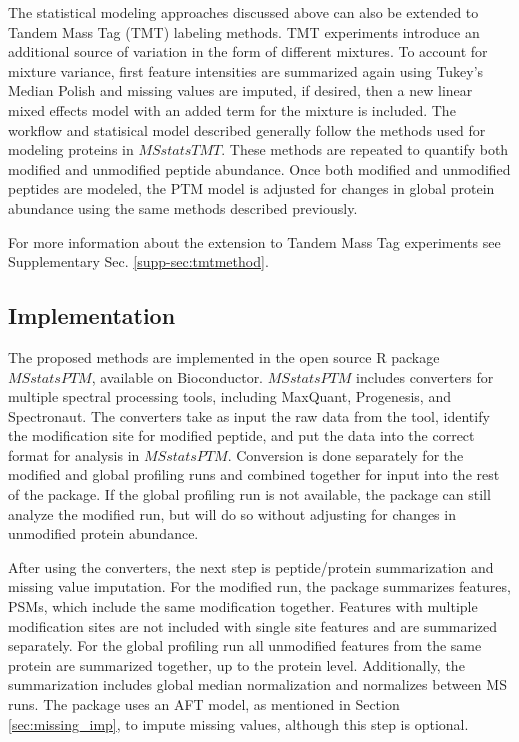 \documentclass[mcp]{article}
\numberwithin{figure}{section} %
\numberwithin{table}{section}
\begin{document}
The statistical modeling approaches discussed above can also be extended to Tandem Mass Tag (TMT) labeling methods. TMT experiments introduce an additional source of variation in the form of different mixtures. To account for mixture variance, first feature intensities are summarized again using Tukey's Median Polish and missing values are imputed, if desired, then a new linear mixed effects model with an added term for the mixture is included. The workflow and statisical model described generally follow the methods used for modeling proteins in $MSstatsTMT$. \cite{Huang:2020} These methods are repeated to quantify both modified and unmodified peptide abundance. Once both modified and unmodified peptides are modeled, the PTM model is adjusted for changes in global protein abundance using the same methods described previously. 

For more information about the extension to Tandem Mass Tag experiments see Supplementary Sec. \ref{supp-sec:tmtmethod}.

\subsection*{Implementation}

The proposed methods are implemented in the open source R package $MSstatsPTM$, available on Bioconductor. $MSstatsPTM$ includes converters for multiple spectral processing tools, including MaxQuant, Progenesis, and Spectronaut. The converters take as input the raw data from the tool, identify the modification site for modified peptide, and put the data into the correct format for analysis in $MSstatsPTM$. Conversion is done separately for the modified and global profiling runs and combined together for input into the rest of the package. If the global profiling run is not available, the package can still analyze the modified run, but will do so without adjusting for changes in unmodified protein abundance. 

After using the converters, the next step is peptide/protein summarization and missing value imputation. For the modified run, the package summarizes features, PSMs, which include the same modification together. Features with multiple modification sites are not included with single site features and are summarized separately. For the global profiling run all unmodified features from the same protein are summarized together, up to the protein level. Additionally, the summarization includes global median normalization and normalizes between MS runs. The package uses an AFT model, as mentioned in Section \ref{sec:missing_imp}, to impute missing values, although this step is optional.
\end{document}
